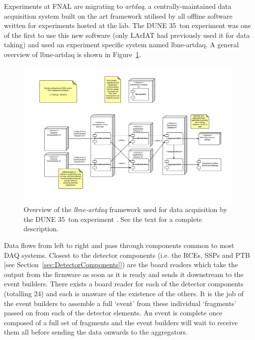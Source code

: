 Experiments at FNAL are migrating to \textit{artdaq}, a centrally-maintained data acquisition system built on the art framework utilised by all offline software written for experiments hosted at the lab.  The DUNE 35~ton experiment was one of the first to use this new software (only LArIAT had previously used it for data taking) and used an experiment specific system named lbne-artdaq.
A general overview of lbne-artdaq is shown in Figure~\ref{fig:lbne-artdaq}.

\begin{figure}[ht]
\centering
  \includegraphics[width=16cm]{artdaqFramework.pdf}
  \caption[The \textit{lbne-artdaq} framework]{Overview of the \textit{lbne-artdaq} framework used for data acquisition by the DUNE 35~ton experiment \cite{Freeman2014}.  See the text for a complete description.}
  \label{fig:lbne-artdaq}
\end{figure}

Data flows from left to right and pass through components common to most DAQ systems.  Closest to the detector components (i.e. the RCEs, SSPs and PTB [see Section~\ref{sec:DetectorComponents}]) are the board readers which take the output from the firmware as soon as it is ready and sends it downstream to the event builders.  There exists a board reader for each of the detector components (totalling 24) and each is unaware of the existence of the others.  It is the job of the event builders to assemble a full `event' from these individual `fragments' passed on from each of the detector elements.  An event is complete once composed of a full set of fragments and the event builders will wait to receive them all before sending the data onwards to the aggregators.

